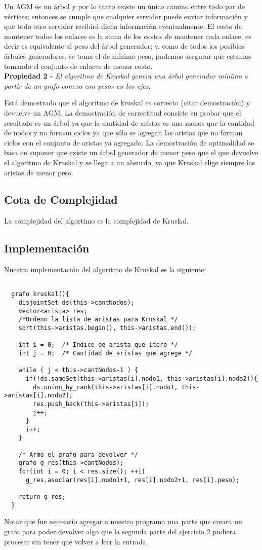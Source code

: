 \par{Un AGM es un árbol y por lo tanto existe un único camino entre todo par
de vértices; entonces se cumple que cualquier servidor puede enviar
información y que todo otro servidor recibirá dicha información eventualmente.
El costo de mantener todos los enlaces es la suma de los costos de mantener
cada enlace, es decir es equivalente al peso del árbol generador; y, como de
todos los posibles árboles generadores, se toma el de mínimo peso, podemos
asegurar que estamos tomando el conjunto de enlaces de menor costo.}\\

\textbf{Propiedad 2 -} \emph{El algoritmo de Kruskal genera una árbol generador
mínimo a partir de un grafo conexo con pesos en los ejes.}\\

\par{Está demostrado que el algoritmo de kruskal es correcto (citar
demostración) y devuelve un AGM. La demostración de correctitud consiste en
probar que el resultado es un árbol ya que la cantidad de aristas es una menos
que la cantidad de nodos y no forman ciclos ya que sólo se agregan las aristas
que no forman ciclos con el conjunto de aristas ya agregado. La demostración
de optimalidad se basa en suponer que existe un árbol generador de menor
peso que el que devuelve el algoritmo de Kruskal y se llega a un absurdo,
ya que Kruskal elige siempre las aristas de menor peso.}

\subsection{Cota de Complejidad}

\par{La complejidad del algortimo es la complejidad de Kruskal.}

\subsection{Implementación}

Nuestra implementación del algoritmo de Kruskal es la siguiente:
\begin{lstlisting}
  
  grafo kruskal(){
    disjointSet ds(this->cantNodos);
    vector<arista> res;
    /*Ordeno la lista de aristas para Kruskal */
    sort(this->aristas.begin(), this->aristas.end()); 
        
    int i = 0;  /* Indice de arista que itero */
    int j = 0;  /* Cantidad de aristas que agrege */
    
    while ( j < this->cantNodos-1 ) {
      if(!ds.sameSet(this->aristas[i].nodo1, this->aristas[i].nodo2)){
        ds.union_by_rank(this->aristas[i].nodo1, this->aristas[i].nodo2);
        res.push_back(this->aristas[i]);
        j++;
      }
      i++;
    }
    
    /* Armo el grafo para devolver */
    grafo g_res(this->cantNodos);
    for(int i = 0; i < res.size(); ++i)
      g_res.asociar(res[i].nodo1+1, res[i].nodo2+1, res[i].peso);
    
    return g_res;
  }
\end{lstlisting}

Notar que fue necesario agregar a nuestro programa una parte que creara un grafo para poder devolver algo que la segunda parte del ejercicio 2 pudiera procesar sin tener que volver a leer la entrada.
